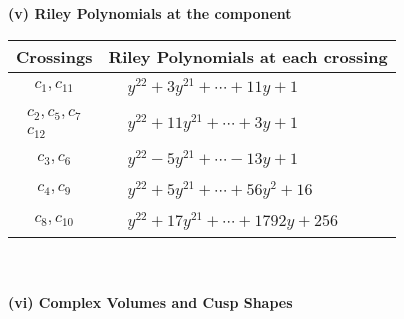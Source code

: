 \documentclass[1p]{elsarticle_modified}
\theoremstyle{definition}
\begin{document}
\newpage\renewcommand{\arraystretch}{1}
\flushleft \textbf{(v) Riley Polynomials at the component}\newline \\
\begin{tabular}{m{50pt}|m{274pt}}
Crossings & \hspace{64pt}Riley Polynomials at each crossing \\
\hline $$\begin{aligned}c_{1},c_{11}\end{aligned}$$&$\begin{aligned}
&y^{22}+3 y^{21}+\cdots+11 y+1
\end{aligned}$\\
\hline $$\begin{aligned}c_{2},c_{5},c_{7}\\c_{12}\end{aligned}$$&$\begin{aligned}
&y^{22}+11 y^{21}+\cdots+3 y+1
\end{aligned}$\\
\hline $$\begin{aligned}c_{3},c_{6}\end{aligned}$$&$\begin{aligned}
&y^{22}-5 y^{21}+\cdots-13 y+1
\end{aligned}$\\
\hline $$\begin{aligned}c_{4},c_{9}\end{aligned}$$&$\begin{aligned}
&y^{22}+5 y^{21}+\cdots+56 y^2+16
\end{aligned}$\\
\hline $$\begin{aligned}c_{8},c_{10}\end{aligned}$$&$\begin{aligned}
&y^{22}+17 y^{21}+\cdots+1792 y+256
\end{aligned}$\\
\hline
\end{tabular}\\~\\
\newpage\flushleft \textbf{(vi) Complex Volumes and Cusp Shapes}
\end{document}
